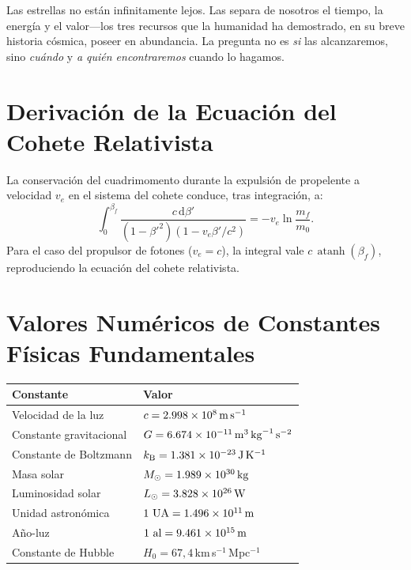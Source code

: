 \documentclass[12pt,a4paper]{article}
\newcommand{\dd}{\mathrm{d}}
\newcommand{\kB}{k_{\mathrm{B}}}
\newcommand{\AU}{\,\text{UA}}
\newcommand{\ly}{\,\text{al}}
\newcommand{\Msun}{M_{\odot}}
\DeclareMathOperator{\atanh}{atanh}
\begin{document}
Las estrellas no están infinitamente lejos. Las separa de nosotros el tiempo,
la energía y el valor---los tres recursos que la humanidad ha demostrado, en
su breve historia cósmica, poseer en abundancia. La pregunta no es \emph{si}
las alcanzaremos, sino \emph{cuándo} y \emph{a quién encontraremos} cuando
lo hagamos.

\appendix

\section{Derivación de la Ecuación del Cohete Relativista}

La conservación del cuadrimomento durante la expulsión de propelente a
velocidad $v_e$ en el sistema del cohete conduce, tras integración, a:
\begin{equation}
  \int_0^{\beta_f} \frac{c\,\dd\beta'}{(1-\beta'^2)(1 - v_e\beta'/c^2)}
  = -v_e \ln\frac{m_f}{m_0}.
\end{equation}
Para el caso del propulsor de fotones ($v_e = c$), la integral vale
$c\,\atanh(\beta_f)$, reproduciendo la ecuación del cohete relativista.

\section{Valores Numéricos de Constantes Físicas Fundamentales}

\begin{tabular}{ll}
  \toprule
  Constante & Valor \\
  \midrule
  Velocidad de la luz & $c = \SI{2{,}998e8}{\meter\per\second}$ \\
  Constante gravitacional & $G = \SI{6{,}674e-11}{\meter\cubed\per\kilo\gram\per\second\squared}$ \\
  Constante de Boltzmann & $\kB = \SI{1{,}381e-23}{\joule\per\kelvin}$ \\
  Masa solar & $\Msun = \SI{1{,}989e30}{\kilo\gram}$ \\
  Luminosidad solar & $L_\odot = \SI{3{,}828e26}{\watt}$ \\
  Unidad astronómica & $\SI{1}{\AU} = \SI{1{,}496e11}{\meter}$ \\
  Año-luz & $\SI{1}{\ly} = \SI{9{,}461e15}{\meter}$ \\
  Constante de Hubble & $H_0 = 67{,}4$\,km\,s$^{-1}$\,Mpc$^{-1}$ \\
  \bottomrule
\end{tabular}



\end{document}
